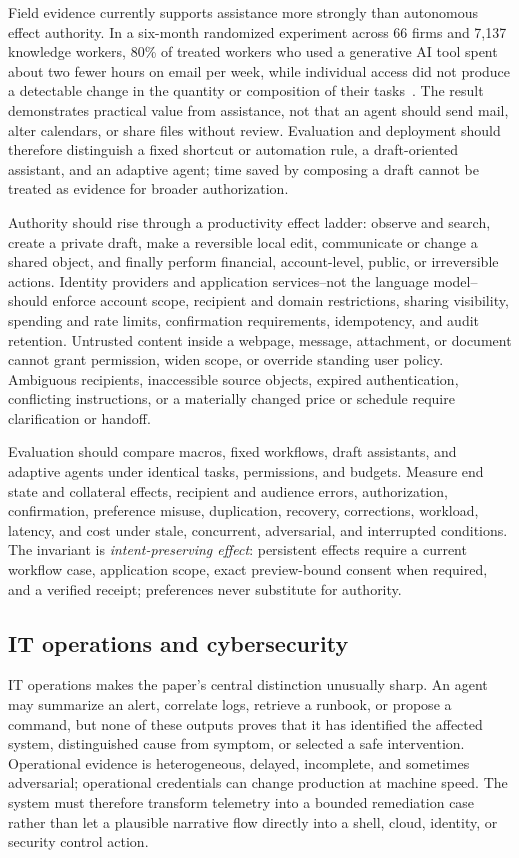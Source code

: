 Field evidence currently supports assistance more strongly than autonomous effect authority. In a six-month randomized experiment across 66 firms and 7,137 knowledge workers, 80\% of treated workers who used a generative AI tool spent about two fewer hours on email per week, while individual access did not produce a detectable change in the quantity or composition of their tasks~\cite{dillon2025shiftingwork}. The result demonstrates practical value from assistance, not that an agent should send mail, alter calendars, or share files without review. Evaluation and deployment should therefore distinguish a fixed shortcut or automation rule, a draft-oriented assistant, and an adaptive agent; time saved by composing a draft cannot be treated as evidence for broader authorization.

Authority should rise through a productivity effect ladder: observe and search, create a private draft, make a reversible local edit, communicate or change a shared object, and finally perform financial, account-level, public, or irreversible actions. Identity providers and application services--not the language model--should enforce account scope, recipient and domain restrictions, sharing visibility, spending and rate limits, confirmation requirements, idempotency, and audit retention. Untrusted content inside a webpage, message, attachment, or document cannot grant permission, widen scope, or override standing user policy. Ambiguous recipients, inaccessible source objects, expired authentication, conflicting instructions, or a materially changed price or schedule require clarification or handoff.

Evaluation should compare macros, fixed workflows, draft assistants, and adaptive agents under identical tasks, permissions, and budgets. Measure end state and collateral effects, recipient and audience errors, authorization, confirmation, preference misuse, duplication, recovery, corrections, workload, latency, and cost under stale, concurrent, adversarial, and interrupted conditions. The invariant is \emph{intent-preserving effect}: persistent effects require a current workflow case, application scope, exact preview-bound consent when required, and a verified receipt; preferences never substitute for authority.

\subsection{IT operations and cybersecurity}

IT operations makes the paper's central distinction unusually sharp. An agent may summarize an alert, correlate logs, retrieve a runbook, or propose a command, but none of these outputs proves that it has identified the affected system, distinguished cause from symptom, or selected a safe intervention. Operational evidence is heterogeneous, delayed, incomplete, and sometimes adversarial; operational credentials can change production at machine speed. The system must therefore transform telemetry into a bounded remediation case rather than let a plausible narrative flow directly into a shell, cloud, identity, or security control action.

